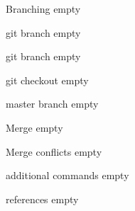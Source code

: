 \begin{frame}[fragile]{Branching}
    empty
\end{frame}

\begin{frame}[fragile]{git branch}
    empty
\end{frame}

\begin{frame}[fragile]{git branch \insertcontinuationtext}
    empty
\end{frame}

\begin{frame}[fragile]{git checkout }
    empty
\end{frame}

\begin{frame}[fragile]{master branch}
    empty
\end{frame}

\begin{frame}[fragile]{Merge}
    empty
\end{frame}

\begin{frame}[fragile]{Merge conflicts}
    empty
\end{frame}

\begin{frame}[fragile]{additional commands}
    empty
\end{frame}

\begin{frame}[fragile]{references}
    empty
\end{frame}